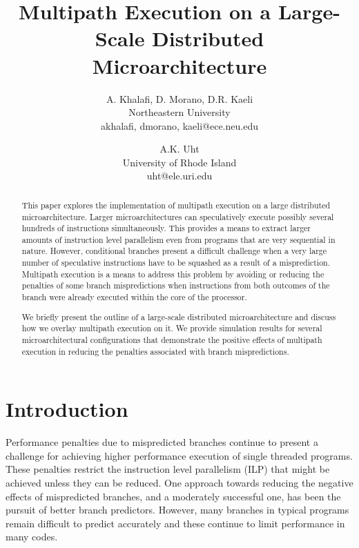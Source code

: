 \documentclass[10pt,dvips]{article}
\begin{document}
\parskip 3mm
%
%
\title{Multipath Execution on a Large-Scale Distributed 
Microarchitecture}
%
\author{
A. Khalafi, D. Morano, D.R. Kaeli\\
Northeastern University\\
{akhalafi, dmorano, kaeli}@ece.neu.edu\\
\and
A.K. Uht \\
University of Rhode Island\\ uht@ele.uri.edu
}
%
\maketitle
\thispagestyle{empty}
%
\begin{abstract}
This paper explores the implementation of multipath execution on a
large distributed microarchitecture.  Larger microarchitectures can
speculatively execute possibly several hundreds of instructions
simultaneously.  This provides a means to extract larger amounts of
instruction level parallelism even from programs that are very
sequential in nature.  However, conditional branches present a
difficult challenge when a very large number of speculative
instructions have to be squashed as a result of a misprediction.
Multipath execution is a means to address this problem
by avoiding or reducing the penalties of some branch mispredictions when
instructions from both outcomes of the branch were
already executed within the core of the processor.

We briefly present the outline of a large-scale distributed
microarchitecture and discuss how we overlay multipath execution on
it.  We provide simulation results for several microarchitectural
configurations that demonstrate the positive effects of multipath
execution in reducing the penalties associated with branch
mispredictions.
\end{abstract}
%
\section{Introduction}
%
Performance penalties due to mispredicted branches continue to
present a challenge for achieving higher performance execution
of single threaded programs.
These penalties restrict the instruction level parallelism (ILP)
that might be achieved unless they can be reduced.
One approach towards reducing the negative effects of mispredicted
branches, and a moderately successful one, has been the pursuit
of better branch predictors.  However, many branches in typical
programs remain difficult to predict accurately and these continue
to limit performance in many codes.
\end{document}
